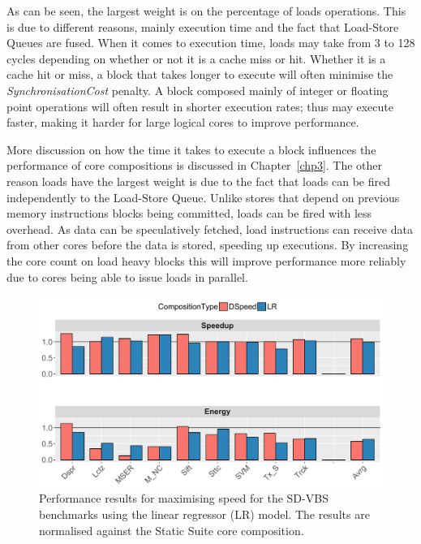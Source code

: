 As can be seen, the largest weight is on the percentage of loads operations.
This is due to different reasons, mainly execution time and the fact that Load-Store Queues are fused.
When it comes to execution time, loads may take from 3 to 128 cycles depending on whether or not it is a cache miss or hit.
Whether it is a cache hit or miss, a block that takes longer to execute will often minimise the \textit{SynchronisationCost} penalty.
A block composed mainly of integer or floating point operations will often result in shorter execution rates; thus may execute faster, making it harder for large logical cores to improve performance.

More discussion on how the time it takes to execute a block influences the performance of core compositions is discussed in Chapter~\ref{chp3}.
The other reason loads have the largest weight is due to the fact that loads can be fired independently to the Load-Store Queue.
Unlike stores that depend on previous memory instructions blocks being committed, loads can be fired with less overhead.
As data can be speculatively fetched, load instructions can receive data from other cores before the data is stored, speeding up executions.
By increasing the core count on load heavy blocks this will improve performance more reliably due to cores being able to issue loads in parallel.

\begin{figure}[t]
    \centering
	\includegraphics[width=1\textwidth]{cases-paper/graphics/results/lr_speed3.pdf}
    \caption{Performance results for maximising speed for the SD-VBS benchmarks using the linear regressor (LR) model. The results are normalised against the Static Suite core composition.}%
    \label{fig:speedlr}
	\vspace{1em}
\end{figure}

